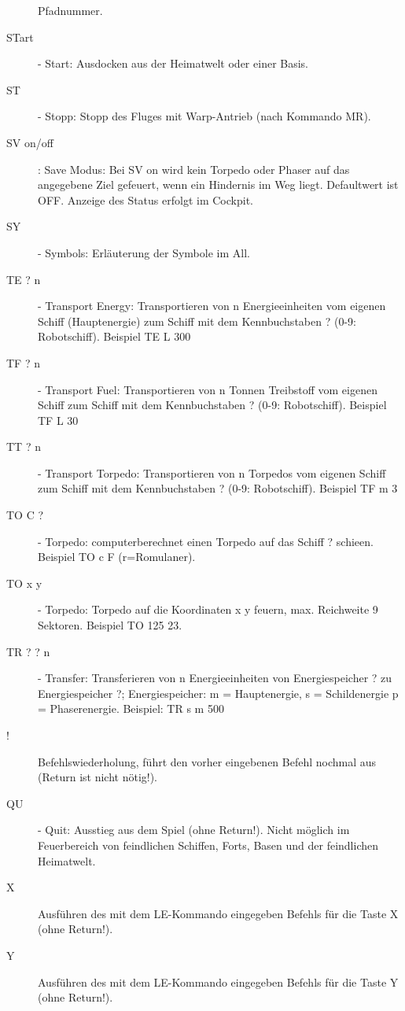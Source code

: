 \begin{description}
               Pfadnummer.
\item [STart] - Start: Ausdocken aus der Heimatwelt oder einer Basis.
\item [ST] - Stopp: Stopp des Fluges mit Warp-Antrieb (nach Kommando MR).
\item[SV on/off]: Save Modus: Bei SV on wird kein Torpedo oder Phaser auf
       das angegebene Ziel gefeuert, wenn ein Hindernis im Weg liegt. 
       Defaultwert ist OFF. Anzeige des Status erfolgt im Cockpit.
\item [SY] - Symbols: Erl\"auterung der Symbole im All.
\item [TE ? n] - Transport Energy:  Transportieren von n Energieeinheiten 
           vom eigenen Schiff (Hauptenergie) zum Schiff
           mit dem Kennbuchstaben ? (0-9: Robotschiff). Beispiel TE L 300
\item [TF ? n] - Transport Fuel:  Transportieren von n Tonnen Treibstoff 
           vom eigenen Schiff zum Schiff
           mit dem Kennbuchstaben ? (0-9: Robotschiff). Beispiel TF L 30
\item [TT ? n] - Transport Torpedo:  Transportieren von n Torpedos 
           vom eigenen Schiff zum Schiff
           mit dem Kennbuchstaben ? (0-9: Robotschiff). Beispiel TF m 3
\item [TO C ?] - Torpedo: computerberechnet einen Torpedo
          auf das Schiff ? schie\3en. Beispiel TO c F (r=Romulaner).
\item [TO x y] - Torpedo: Torpedo auf die Koordinaten x y feuern, 
          max. Reichweite 9 Sektoren. Beispiel TO 125 23.
\item [TR ? ? n] - Transfer: Transferieren von n Energieeinheiten 
           von Energiespeicher ?  zu Energiespeicher ?; Energiespeicher:
               m = Hauptenergie, s = Schildenergie p = Phaserenergie.
          Beispiel: TR s m 500
\item [!] Befehlswiederholung, f\"uhrt den vorher eingebenen Befehl nochmal aus
         (Return ist nicht n\"otig!).
\item [QU] - Quit: Ausstieg aus dem Spiel (ohne Return!). Nicht m\"oglich
         im Feuerbereich von feindlichen Schiffen, Forts, Basen
         und der feindlichen Heimatwelt.
\item [X] Ausf\"uhren des mit dem LE-Kommando eingegeben 
          Befehls f\"ur die Taste X (ohne Return!).
\item [Y] Ausf\"uhren des mit dem LE-Kommando eingegeben 
          Befehls f\"ur die Taste Y (ohne Return!).
\end{description}      

